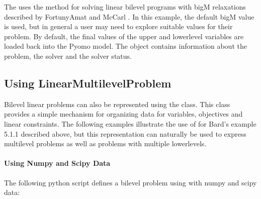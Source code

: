 \documentclass[letterpaper,10pt,english]{sphinxmanual}
\begin{document}
The  uses the method for solving linear bilevel
programs with big\sphinxhyphen{}M relaxations described by Fortuny\sphinxhyphen{}Amat and McCarl
.  In this example, the default big\sphinxhyphen{}M value is used, but
in general a user may need to explore suitable values for their problem.
By default, the final values of the upper\sphinxhyphen{} and lower\sphinxhyphen{}level variables
are loaded back into the Pyomo model.  The  object contains
information about the problem, the solver and the solver status.


\subsection{Using LinearMultilevelProblem}
\label{\detokenize{examples:using-linearmultilevelproblem}}
Bilevel linear problems can also be represented using the
 class.  This class provides a simple mechanism
for organizing data for variables, objectives and linear constraints.  The following
examples illustrate the use of  for Bard’s example 5.1.1 described
above, but this representation can naturally be used to express multi\sphinxhyphen{}level problems as well
as problems with multiple lower\sphinxhyphen{}levels.


\paragraph{Using Numpy and Scipy Data}
\label{\detokenize{examples:using-numpy-and-scipy-data}}
The following python script defines a bilevel problem using  with
numpy and scipy data:
\end{document}
